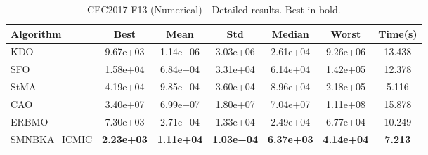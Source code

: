 \begin{table}[H]
\centering\small
\caption{CEC2017 F13 (Numerical) - Detailed results. Best in bold.}
\label{tab:cec2017_F13}
\begin{tabular}{lcccccc}
\toprule
\textbf{Algorithm} & \textbf{Best} & \textbf{Mean} & \textbf{Std} & \textbf{Median} & \textbf{Worst} & \textbf{Time(s)} \\
\midrule
KDO & 9.67e+03 & 1.14e+06 & 3.03e+06 & 2.61e+04 & 9.26e+06 & 13.438 \\
SFO & 1.58e+04 & 6.84e+04 & 3.31e+04 & 6.14e+04 & 1.42e+05 & 12.378 \\
StMA & 4.19e+04 & 9.85e+04 & 3.60e+04 & 8.96e+04 & 2.18e+05 & 5.116 \\
CAO & 3.40e+07 & 6.99e+07 & 1.80e+07 & 7.04e+07 & 1.11e+08 & 15.878 \\
ERBMO & 7.30e+03 & 2.71e+04 & 1.33e+04 & 2.49e+04 & 6.77e+04 & 10.249 \\
SMNBKA_ICMIC & \textbf{2.23e+03} & \textbf{1.11e+04} & \textbf{1.03e+04} & \textbf{6.37e+03} & \textbf{4.14e+04} & \textbf{7.213} \\
\bottomrule
\end{tabular}
\end{table}
